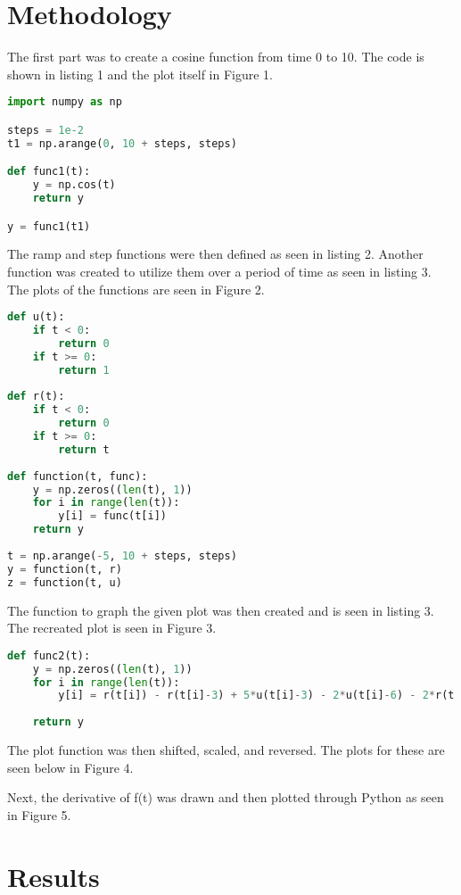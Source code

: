 \documentclass[12pt]{report}
\begin{document}
\section{Methodology}
The first part was to create a cosine function from time 0 to 10. The code is shown in listing 1 and the plot itself in Figure 1.
\begin{lstlisting}[language=Python, caption=Defining the function to plot cos(t) from 0 \textless{} t \textless{} 10]
import numpy as np

steps = 1e-2
t1 = np.arange(0, 10 + steps, steps)

def func1(t):
    y = np.cos(t)
    return y

y = func1(t1)
\end{lstlisting}

The ramp and step functions were then defined as seen in listing 2. Another function was created to utilize them over a period of time as seen in listing 3. The plots of the functions are seen in Figure 2.
\begin{lstlisting}[language=Python, caption=Defining and implementing step and ramp functions]
def u(t):
    if t < 0:
        return 0
    if t >= 0:
        return 1
    
def r(t):
    if t < 0:
        return 0
    if t >= 0:
        return t
        
def function(t, func):
    y = np.zeros((len(t), 1))
    for i in range(len(t)):
        y[i] = func(t[i])
    return y
    
t = np.arange(-5, 10 + steps, steps)
y = function(t, r)
z = function(t, u)
\end{lstlisting}

The function to graph the given plot was then created and is seen in listing 3. The recreated plot is seen in Figure 3.
\begin{lstlisting}[language=Python, caption=Defining the given plot function]
def func2(t):
    y = np.zeros((len(t), 1))
    for i in range(len(t)):
        y[i] = r(t[i]) - r(t[i]-3) + 5*u(t[i]-3) - 2*u(t[i]-6) - 2*r(t[i]-6)
    
    return y
\end{lstlisting}

The plot function was then shifted, scaled, and reversed. The plots for these are seen below in Figure 4.

Next, the derivative of f(t) was drawn and then plotted through Python as seen in Figure 5.

\section{Results}
\end{document}
